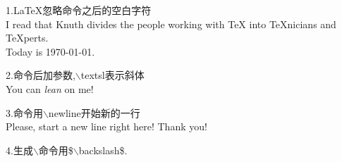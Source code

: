 \documentclass{article}
\begin{document}
    1.LaTeX忽略命令之后的空白字符\\
    I read that Knuth divides the people working
    with \TeX{} into \TeX{}nicians and \TeX perts.\\
    Today is \today.

    
    2.命令后加参数,$\backslash$textsl表示斜体\\
    You can \textsl{lean} on me! 

    3.命令用$\backslash$newline开始新的一行\\
    Please, start a new line right here!\newline
    Thank you! 

    4.生成$\backslash$命令用\$$\backslash$backslash\$.

    
\end{document}
